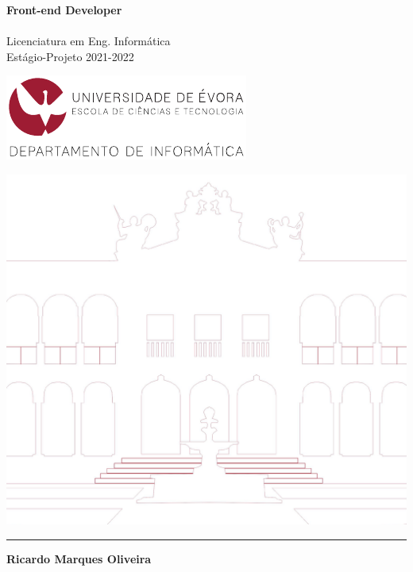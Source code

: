 \documentclass{article}
\begin{document}
\begin{titlepage}

\begin{minipage}{0.7\textwidth}
\noindent\LARGE\textbf{Front-end Developer\\\\}
\Large{Licenciatura em Eng. Informática\\}
\large{Estágio-Projeto 2021-2022\\}
\end{minipage}
\begin{minipage}[t]{0.3\textwidth}\raggedleft
\includegraphics[width=.9\linewidth]{images/di.pdf}
\end{minipage}
\noindent
\includegraphics[trim={0 2cm 0 0}, clip,  width=\linewidth]{images/claustros.png}\\

\vspace{0.5cm}
\noindent\textcolor{castanho-ue}{\rule{\textwidth}{0.03cm}}

\vspace{0.5cm}
\noindent\large\textbf{Ricardo Marques Oliveira\\}


\end{titlepage}
\end{document}
